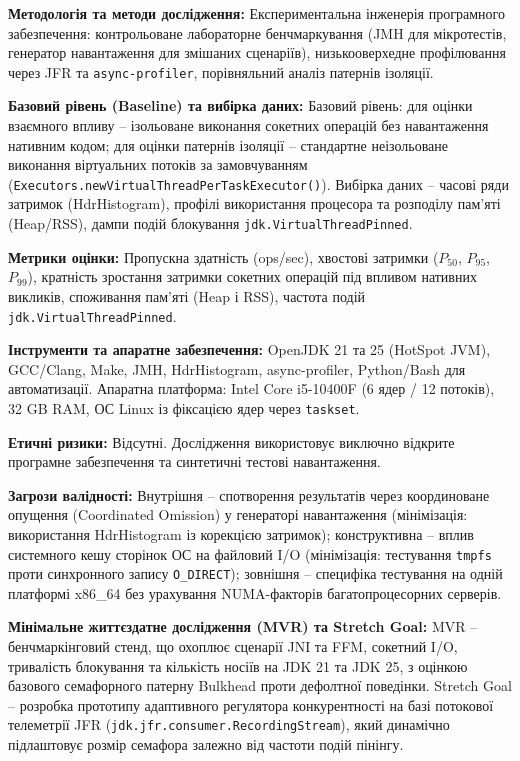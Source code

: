 \textbf{Методологія та методи дослідження:} Експериментальна інженерія програмного забезпечення: контрольоване лабораторне бенчмаркування (JMH для мікротестів, генератор навантаження для змішаних сценаріїв), низькооверхедне профілювання через JFR та \texttt{async-profiler}, порівняльний аналіз патернів ізоляції.

\textbf{Базовий рівень (Baseline) та вибірка даних:} Базовий рівень: для оцінки взаємного впливу -- ізольоване виконання сокетних операцій без навантаження нативним кодом; для оцінки патернів ізоляції -- стандартне неізольоване виконання віртуальних потоків за замовчуванням (\texttt{Executors.newVirtualThreadPerTaskExecutor()}). Вибірка даних -- часові ряди затримок (HdrHistogram), профілі використання процесора та розподілу пам'яті (Heap/RSS), дампи подій блокування \texttt{jdk.VirtualThreadPinned}.

\textbf{Метрики оцінки:} Пропускна здатність (ops/sec), хвостові затримки ($P_{50}$, $P_{95}$, $P_{99}$), кратність зростання затримки сокетних операцій під впливом нативних викликів, споживання пам'яті (Heap і RSS), частота подій \texttt{jdk.VirtualThreadPinned}.

\textbf{Інструменти та апаратне забезпечення:} OpenJDK 21 та 25 (HotSpot JVM), GCC/Clang, Make, JMH, HdrHistogram, async-profiler, Python/Bash для автоматизації. Апаратна платформа: Intel Core i5-10400F (6 ядер / 12 потоків), 32 GB RAM, ОС Linux із фіксацією ядер через \texttt{taskset}.

\textbf{Етичні ризики:} Відсутні. Дослідження використовує виключно відкрите програмне забезпечення та синтетичні тестові навантаження.

\textbf{Загрози валідності:} Внутрішня -- спотворення результатів через координоване опущення (Coordinated Omission) у генераторі навантаження (мінімізація: використання HdrHistogram із корекцією затримок); конструктивна -- вплив системного кешу сторінок ОС на файловий I/O (мінімізація: тестування \texttt{tmpfs} проти синхронного запису \texttt{O\_DIRECT}); зовнішня -- специфіка тестування на одній платформі x86\_64 без урахування NUMA-факторів багатопроцесорних серверів.

\textbf{Мінімальне життєздатне дослідження (MVR) та Stretch Goal:} MVR -- бенчмаркінговий стенд, що охоплює сценарії JNI та FFM, сокетний I/O, тривалість блокування та кількість носіїв на JDK 21 та JDK 25, з оцінкою базового семафорного патерну Bulkhead проти дефолтної поведінки. Stretch Goal -- розробка прототипу адаптивного регулятора конкурентності на базі потокової телеметрії JFR (\texttt{jdk.jfr.consumer.RecordingStream}), який динамічно підлаштовує розмір семафора залежно від частоти подій пінінгу.

